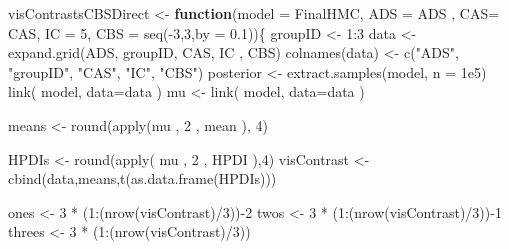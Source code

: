 \documentclass[
  10pt,
  dvipsnames,enabledeprecatedfontcommands]{scrartcl}
\newenvironment{Shaded}{\begin{snugshade}}{\end{snugshade}}
\newcommand{\AttributeTok}[1]{\textcolor[rgb]{0.77,0.63,0.00}{#1}}
\newcommand{\ControlFlowTok}[1]{\textcolor[rgb]{0.13,0.29,0.53}{\textbf{#1}}}
\newcommand{\DecValTok}[1]{\textcolor[rgb]{0.00,0.00,0.81}{#1}}
\newcommand{\FloatTok}[1]{\textcolor[rgb]{0.00,0.00,0.81}{#1}}
\newcommand{\FunctionTok}[1]{\textcolor[rgb]{0.00,0.00,0.00}{#1}}
\newcommand{\NormalTok}[1]{#1}
\newcommand{\OtherTok}[1]{\textcolor[rgb]{0.56,0.35,0.01}{#1}}
\newcommand{\SpecialCharTok}[1]{\textcolor[rgb]{0.00,0.00,0.00}{#1}}
\newcommand{\StringTok}[1]{\textcolor[rgb]{0.31,0.60,0.02}{#1}}
\begin{document}
\begin{Shaded}
\begin{Highlighting}[]
\NormalTok{visContrastsCBSDirect }\OtherTok{\textless{}{-}} \ControlFlowTok{function}\NormalTok{(}\AttributeTok{model =}\NormalTok{ FinalHMC, }\AttributeTok{ADS =}\NormalTok{ ADS , }\AttributeTok{CAS=}\NormalTok{ CAS, }\AttributeTok{IC =}  \DecValTok{5}\NormalTok{,}
                            \AttributeTok{CBS =} \FunctionTok{seq}\NormalTok{(}\SpecialCharTok{{-}}\DecValTok{3}\NormalTok{,}\DecValTok{3}\NormalTok{,}\AttributeTok{by  =} \FloatTok{0.1}\NormalTok{))\{}
\NormalTok{  groupID }\OtherTok{\textless{}{-}} \DecValTok{1}\SpecialCharTok{:}\DecValTok{3}
\NormalTok{  data }\OtherTok{\textless{}{-}} \FunctionTok{expand.grid}\NormalTok{(ADS, groupID, CAS, IC , CBS)}
  \FunctionTok{colnames}\NormalTok{(data) }\OtherTok{\textless{}{-}} \FunctionTok{c}\NormalTok{(}\StringTok{"ADS"}\NormalTok{, }\StringTok{"groupID"}\NormalTok{, }\StringTok{"CAS"}\NormalTok{, }\StringTok{"IC"}\NormalTok{, }\StringTok{"CBS"}\NormalTok{)}
\NormalTok{  posterior }\OtherTok{\textless{}{-}} \FunctionTok{extract.samples}\NormalTok{(model, }\AttributeTok{n =} \FloatTok{1e5}\NormalTok{)}
  \FunctionTok{link}\NormalTok{( model, }\AttributeTok{data=}\NormalTok{data ) }
\NormalTok{  mu }\OtherTok{\textless{}{-}} \FunctionTok{link}\NormalTok{( model, }\AttributeTok{data=}\NormalTok{data ) }
  
\NormalTok{  means }\OtherTok{\textless{}{-}}  \FunctionTok{round}\NormalTok{(}\FunctionTok{apply}\NormalTok{(mu , }\DecValTok{2}\NormalTok{ , mean ), }\DecValTok{4}\NormalTok{)}
  
\NormalTok{  HPDIs }\OtherTok{\textless{}{-}} \FunctionTok{round}\NormalTok{(}\FunctionTok{apply}\NormalTok{( mu , }\DecValTok{2}\NormalTok{ , HPDI ),}\DecValTok{4}\NormalTok{)}
\NormalTok{  visContrast }\OtherTok{\textless{}{-}} \FunctionTok{cbind}\NormalTok{(data,means,}\FunctionTok{t}\NormalTok{(}\FunctionTok{as.data.frame}\NormalTok{(HPDIs)))}
  
\NormalTok{  ones }\OtherTok{\textless{}{-}} \DecValTok{3} \SpecialCharTok{*}\NormalTok{ (}\DecValTok{1}\SpecialCharTok{:}\NormalTok{(}\FunctionTok{nrow}\NormalTok{(visContrast)}\SpecialCharTok{/}\DecValTok{3}\NormalTok{))}\SpecialCharTok{{-}}\DecValTok{2}
\NormalTok{  twos }\OtherTok{\textless{}{-}} \DecValTok{3} \SpecialCharTok{*}\NormalTok{ (}\DecValTok{1}\SpecialCharTok{:}\NormalTok{(}\FunctionTok{nrow}\NormalTok{(visContrast)}\SpecialCharTok{/}\DecValTok{3}\NormalTok{))}\SpecialCharTok{{-}}\DecValTok{1}
\NormalTok{  threes }\OtherTok{\textless{}{-}} \DecValTok{3} \SpecialCharTok{*}\NormalTok{ (}\DecValTok{1}\SpecialCharTok{:}\NormalTok{(}\FunctionTok{nrow}\NormalTok{(visContrast)}\SpecialCharTok{/}\DecValTok{3}\NormalTok{))}
  

\end{Highlighting}
\end{Shaded}
\end{document}
